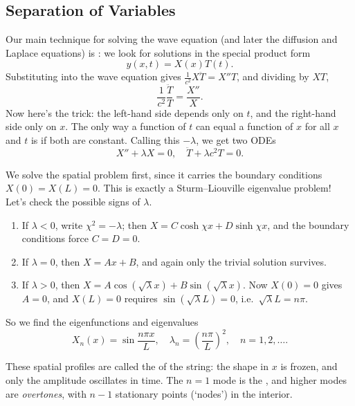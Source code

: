 \subsection{Separation of Variables}

Our main technique for solving the wave equation (and later the diffusion and Laplace equations) is : we look for solutions in the special product form
$$
y(x, t) = X(x) T(t).
$$
Substituting into the wave equation gives $\frac{1}{c^2} X \ddot{T} = X'' T$, and dividing by $XT$,
$$
\frac{1}{c^2} \frac{\ddot{T}}{T} = \frac{X''}{X}.
$$
Now here's the trick: the left-hand side depends only on $t$, and the right-hand side only on $x$. The only way a function of $t$ can equal a function of $x$ for all $x$ and $t$ is if both are constant. Calling this  $-\lambda$, we get two ODEs
$$
X'' + \lambda X = 0, \quad \ddot{T} + \lambda c^2 T = 0.
$$

We solve the spatial problem first, since it carries the boundary conditions $X(0) = X(L) = 0$. This is exactly a Sturm--Liouville eigenvalue problem! Let's check the possible signs of $\lambda$.
\begin{enumerate}[label=(\roman*)]
    \item If $\lambda < 0$, write $\chi^2 = -\lambda$; then $X = C \cosh \chi x + D \sinh \chi x$, and the boundary conditions force $C = D = 0$.
    \item If $\lambda = 0$, then $X = Ax + B$, and again only the trivial solution survives.
    \item If $\lambda > 0$, then $X = A \cos(\sqrt{\lambda} x) + B \sin(\sqrt{\lambda}x)$. Now $X(0) = 0$ gives $A = 0$, and $X(L) = 0$ requires $\sin (\sqrt{\lambda} L) = 0$, i.e.\ $\sqrt{\lambda} L = n \pi$.
\end{enumerate}
So we find the eigenfunctions and eigenvalues
$$
X_n(x) = \sin \frac{n \pi x}{L}, \quad \lambda_n = \left(\frac{n \pi}{L}\right)^2, \quad n = 1, 2, \dots.
$$

These spatial profiles are called the  of the string: the shape in $x$ is frozen, and only the amplitude oscillates in time. The $n = 1$ mode is the , and higher modes are \emph{overtones}, with $n - 1$ stationary points (`nodes') in the interior.

